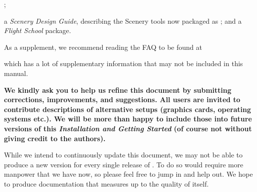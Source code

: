 ;
 \medskip

 \noindent
a \textit{\FlightGear{} Scenery Design Guide},
describing the Scenery tools now packaged as \TerraGear{}; and a \textit{\FlightGear{}
Flight School} package.
 \medskip

As a supplement, we recommend reading the \FlightGear{} FAQ to be found at


which has a lot of supplementary information that may not be included in this manual.

\textbf{We kindly ask you to help us refine this document by submitting corrections,
improvements, and suggestions. All users are invited to contribute descriptions of alternative
setups (graphics cards, operating systems etc.). We will be more than happy to include
those into future versions of this \textit{Installation and Getting Started} (of course
not without giving credit to the authors).}

While we intend to continuously update this document, we may not be able to produce a
new version for every single release of {\FlightGear{}}.  To do so would require more
manpower that we have now, so please feel free to jump in and help out.  We hope to
produce documentation that measures up to the quality of \FlightGear{} itself.


